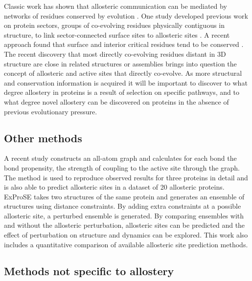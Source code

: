 Classic work has shown that allosteric communication can be mediated by networks of residues conserved by evolution \cite{Suel2003}.
One study developed previous work on protein sectors, groups of co-evolving residues physically contiguous in structure, to link sector-connected surface sites to allosteric sites \cite{Reynolds2011}.
A recent approach found that surface and interior critical residues tend to be conserved \cite{Clarke2016}.
The recent discovery that most directly co-evolving residues distant in 3D structure are close in related structures or assemblies \cite{Anishchenko2017} brings into question the concept of allosteric and active sites that directly co-evolve.
As more structural and conservation information is acquired it will be important to discover to what degree allostery in proteins is a result of selection on specific pathways, and to what degree novel allostery can be discovered on proteins in the absence of previous evolutionary pressure.

\subsection{Other methods}

A recent study \cite{Amor2016} constructs an all-atom graph and calculates for each bond the bond propensity, the strength of coupling to the active site through the graph.
The method is used to reproduce observed results for three proteins in detail and is also able to predict allosteric sites in a dataset of 20 allosteric proteins.
ExProSE \cite{Greener2017} takes two structures of the same protein and generates an ensemble of structures using distance constraints.
By adding extra constraints at a possible allosteric site, a perturbed ensemble is generated.
By comparing ensembles with and without the allosteric perturbation, allosteric sites can be predicted and the effect of perturbation on structure and dynamics can be explored.
This work also includes a quantitative comparison of available allosteric site prediction methods.

\subsection{Methods not specific to allostery}

